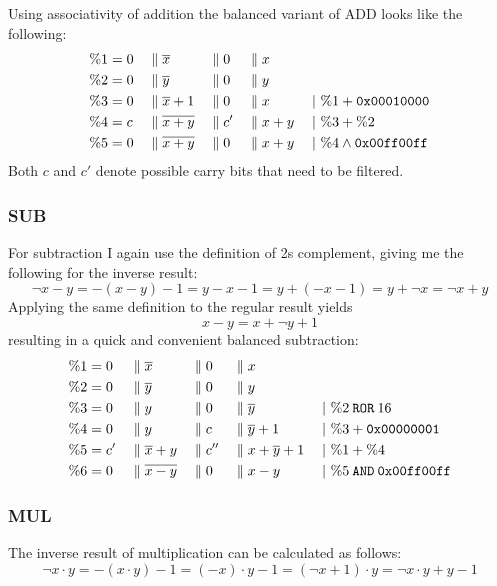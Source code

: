 Using associativity of addition the balanced variant of ADD looks like the following:
\begin{align*}
  \%1 &= 0 && \; \| \; \overline{x} &&\; \| \; 0 &&\; \| \; x      &&\\
  \%2 &= 0 && \; \| \; \overline{y} &&\; \| \; 0 &&\; \| \; y      &&\\
  \%3 &= 0 && \; \| \; \overline{x}+1 &&\; \| \; 0 &&\; \| \; x    &&\;|\ \%1 + \texttt{0x00010000}\\
  \%4 &= c && \; \| \; \overline{x+y} &&\; \| \; c' &&\; \| \; x+y &&\;|\ \%3 + \%2\\
  \%5 &= 0 && \; \| \; \overline{x+y} &&\; \| \; 0 &&\; \| \; x+y  &&\;|\ \%4 \land \texttt{0x00ff00ff}
\end{align*}
Both $c$ and $c'$ denote possible carry bits that need to be filtered.

\subsubsection{SUB}
For subtraction I again use the definition of 2s complement, giving me the following for the inverse result:
\begin{equation*}
  \neg{x-y} = - (x-y) - 1 = y - x - 1 = y + (-x -1) = y + \neg{x} = \neg{x} + y
\end{equation*}
Applying the same definition to the regular result yields
\begin{equation*}
  x-y = x + \neg{y} + 1
\end{equation*}
resulting in a quick and convenient balanced subtraction:
\begin{align*}
  \%1 &= 0 &&\; \| \; \overline{x} &&\; \| \; 0 &&\; \| \; x &&\\
  \%2 &= 0 &&\; \| \; \overline{y} &&\; \| \; 0 &&\; \| \; y &&\\
  \%3 &= 0 &&\; \| \; y &&\; \| \; 0 &&\; \| \; \overline{y} && \;|\ \%2 \mathbin{\texttt{ROR}} 16\\
  \%4 &= 0 &&\; \| \; y &&\; \| \; c &&\; \| \; \overline{y}+1 && \;|\ \%3 + \texttt{0x00000001}\\
  \%5 &= c' &&\; \| \; \overline{x}+y &&\; \| \; c'' &&\; \| \; x+\overline{y}+1 && \;|\ \%1 + \%4\\
  \%6 &= 0 &&\; \| \; \overline{x-y} &&\; \| \; 0 &&\; \| \; x-y && \;|\ \%5 \mathbin{\texttt{AND}} \texttt{0x00ff00ff}
\end{align*}

\subsubsection{MUL}
The inverse result of multiplication can be calculated as follows:
\begin{equation*}
  \neg{x \cdot y} = -(x \cdot y) - 1 = (-x) \cdot y - 1 = (\neg{x} + 1) \cdot y = \neg{x} \cdot y + y - 1
\end{equation*}

